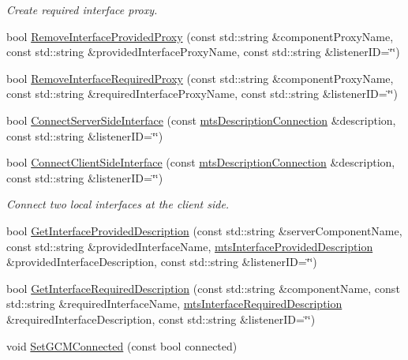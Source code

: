 \begin{DoxyCompactItemize}
\begin{DoxyCompactList}\small\item\em Create required interface proxy. \end{DoxyCompactList}\item 
bool \hyperlink{classmts_manager_local_a741ff68bfb31dcfad6a3ec244f7d2227}{Remove\+Interface\+Provided\+Proxy} (const std\+::string \&component\+Proxy\+Name, const std\+::string \&provided\+Interface\+Proxy\+Name, const std\+::string \&listener\+I\+D=\char`\"{}\char`\"{})
\item 
bool \hyperlink{classmts_manager_local_ac58e53b7cb5f77daf8cdcfb6cc0d0e1e}{Remove\+Interface\+Required\+Proxy} (const std\+::string \&component\+Proxy\+Name, const std\+::string \&required\+Interface\+Proxy\+Name, const std\+::string \&listener\+I\+D=\char`\"{}\char`\"{})
\item 
bool \hyperlink{classmts_manager_local_aad3fbe9e5b41e75e55599f8f7d61b8f0}{Connect\+Server\+Side\+Interface} (const \hyperlink{classmts_description_connection}{mts\+Description\+Connection} \&description, const std\+::string \&listener\+I\+D=\char`\"{}\char`\"{})
\item 
bool \hyperlink{classmts_manager_local_af8f8d230b07f5d647b0e363f7e632160}{Connect\+Client\+Side\+Interface} (const \hyperlink{classmts_description_connection}{mts\+Description\+Connection} \&description, const std\+::string \&listener\+I\+D=\char`\"{}\char`\"{})
\begin{DoxyCompactList}\small\item\em Connect two local interfaces at the client side. \end{DoxyCompactList}\item 
bool \hyperlink{classmts_manager_local_ae131ad1d60cfa1b0abb675905251785a}{Get\+Interface\+Provided\+Description} (const std\+::string \&server\+Component\+Name, const std\+::string \&provided\+Interface\+Name, \hyperlink{classmts_interface_provided_description}{mts\+Interface\+Provided\+Description} \&provided\+Interface\+Description, const std\+::string \&listener\+I\+D=\char`\"{}\char`\"{})
\item 
bool \hyperlink{classmts_manager_local_a8056ed6c161b39b6492a671de76f71f2}{Get\+Interface\+Required\+Description} (const std\+::string \&component\+Name, const std\+::string \&required\+Interface\+Name, \hyperlink{classmts_interface_required_description}{mts\+Interface\+Required\+Description} \&required\+Interface\+Description, const std\+::string \&listener\+I\+D=\char`\"{}\char`\"{})
\item 
void \hyperlink{classmts_manager_local_af2a833e91816219c9e925e580c298182}{Set\+G\+C\+M\+Connected} (const bool connected)
\end{DoxyCompactItemize}
